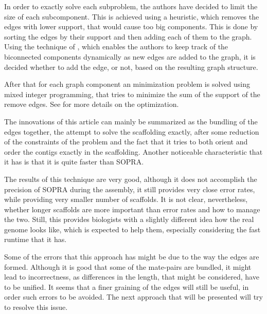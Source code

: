 \documentclass[11pt]{article}
\begin{document}
In order to exactly solve each subproblem, the authors have decided to limit the
size of each subcomponent. This is achieved using a heuristic, which removes the
edges with lower support, that would cause too big components. This is done by
sorting the edges by their support and then adding each of them to the graph.
Using the technique of \cite{westbrook-tarjan}, which enables the authors to
keep track of the biconnected components dynamically as new edges are added to
the graph, it is decided whether to add the edge, or not, based on the resulting
graph structure.

After that for each graph component an minimization problem is solved using
mixed integer programming, that tries to minimize the sum of the support of the
remove edges. See \cite{MIR} for more details on the optimization.

The innovations of this article can mainly be summarized as the bundling of the
edges together, the attempt to solve the scaffolding exactly, after some
reduction of the constraints of the problem and the fact that it tries to both
orient and order the contigs exactly in the scaffolding. Another noticeable
characteristic that it has is that it is quite faster than SOPRA.

The results of this technique are very good, although it does not accomplish the
precision of SOPRA during the assembly, it still provides very close error
rates, while providing very smaller number of scaffolds. It is not clear,
nevertheless, whether longer scaffolds are more important than error rates and
how to manage the two. Still, this provides biologists with a slightly different
idea how the real genome looks like, which is expected to help them, especially
considering the fast runtime that it has.

Some of the errors that this approach has might be due to the way the edges are
formed. Although it is good that some of the mate-pairs are bundled, it might
lead to incorrectness, as differences in the length, that might be considered,
have to be unified. It seems that a finer graining of the edges will still be
useful, in order such errors to be avoided. The next approach that will be
presented will try to resolve this issue.

\end{document}
